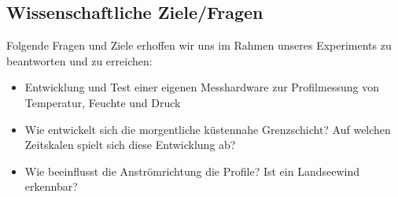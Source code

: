 \documentclass[a4paper,11pt,DIV=calc,tablecaptionabove,headinclude,twoside]{article}
\begin{document}
\subsection{Wissenschaftliche Ziele/Fragen}
Folgende Fragen und Ziele erhoffen wir uns im Rahmen unseres Experiments zu beantworten und zu erreichen:
\begin{itemize}
\item Entwicklung und Test einer eigenen Messhardware zur Profilmessung von
    Temperatur, Feuchte und Druck
\item Wie entwickelt sich die morgentliche küstennahe Grenzschicht? Auf welchen Zeitskalen spielt sich diese Entwicklung ab?
\item Wie beeinflusst die Anströmrichtung die Profile? Ist ein
    Landseewind erkennbar?
\end{itemize}
\end{document}
